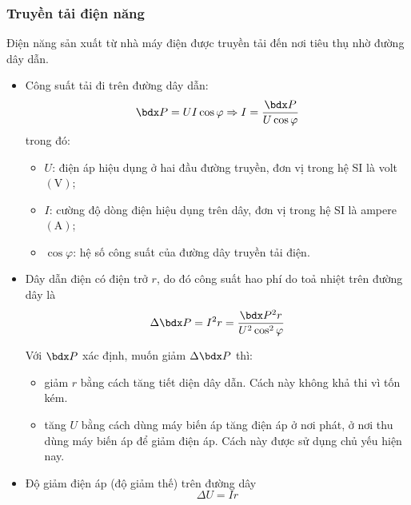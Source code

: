\begin{tomtat}
	\subsubsection{Truyền tải điện năng}
	Điện năng sản xuất từ nhà máy điện được truyền tải đến nơi tiêu thụ nhờ đường dây dẫn.\\
	\begin{itemize}
		\item Công suất tải đi trên đường dây dẫn:
		\begin{equation}
			\calP=UI\cos\varphi\Rightarrow I=\dfrac{\calP}{U\cos\varphi}
		\end{equation}
		trong đó:
		\begin{itemize}
			\item $U$: điện áp hiệu dụng ở hai đầu đường truyền, đơn vị trong hệ SI là volt $\left(\si{\volt}\right)$;
			\item $I$: cường độ dòng điện hiệu dụng trên dây, đơn vị trong hệ SI là ampere $\left(\si{\ampere}\right)$;
			\item $\cos\varphi$: hệ số công suất của đường dây truyền tải điện.
		\end{itemize}
		\item Dây dẫn điện có điện trở $r$, do đó công suất hao phí do toả nhiệt trên đường dây là
		\begin{equation}
			\Delta \calP=I^2r=\dfrac{\calP^2r}{U^2\cos^2\varphi}
		\end{equation}
	\begin{noidung}{}
		Với $\calP$ xác định, muốn giảm $\Delta \calP$ thì:
		\begin{itemize}
			\item giảm $r$ bằng cách tăng tiết diện dây dẫn. Cách này không khả thi vì tốn kém.
			\item tăng $U$ bằng cách dùng máy biến áp tăng điện áp ở nơi phát, ở nơi thu dùng máy biến áp để giảm điện áp. Cách này được sử dụng chủ yếu hiện nay. 
		\end{itemize}
	\end{noidung}
		\item Độ giảm điện áp (độ giảm thế) trên đường dây
		\begin{equation}
			\Delta U=Ir
		\end{equation}
	\end{itemize}
\end{tomtat}
